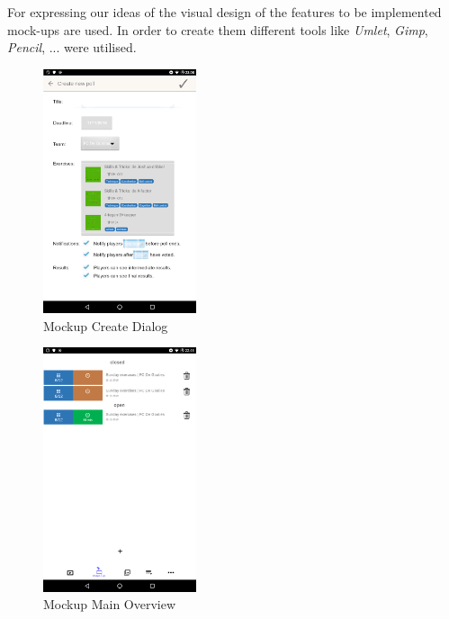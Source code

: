 For expressing our ideas of the visual design of the features to be implemented mock-ups are used. In order to create them different tools like \textit{Umlet}, \textit{Gimp}, \textit{Pencil}, ... were utilised.

\begin{figure}[H]
    \begin{center}
        \includegraphics[width=0.4\textwidth]{images/mockups/create.png}
        \caption{Mockup Create Dialog}
        \label{fig:mockup_create}
    \end{center}
\end{figure}

\begin{figure}[H]
    \begin{center}
        \includegraphics[width=0.4\textwidth]{images/mockups/main-active.png}
        \caption{Mockup Main Overview}
        \label{fig:mockup_main}
    \end{center}
\end{figure}


